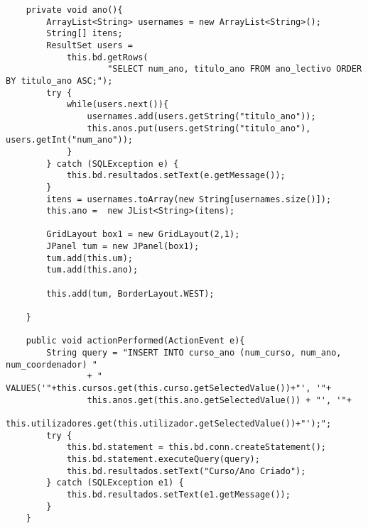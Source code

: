 \begin{lstlisting}
	private void ano(){
		ArrayList<String> usernames = new ArrayList<String>();
		String[] itens;
		ResultSet users = 
			this.bd.getRows(
					"SELECT num_ano, titulo_ano FROM ano_lectivo ORDER BY titulo_ano ASC;");
		try {
			while(users.next()){
				usernames.add(users.getString("titulo_ano"));
				this.anos.put(users.getString("titulo_ano"), users.getInt("num_ano"));
			}
		} catch (SQLException e) {
			this.bd.resultados.setText(e.getMessage());
		}
		itens = usernames.toArray(new String[usernames.size()]);
		this.ano =  new JList<String>(itens);
		
		GridLayout box1 = new GridLayout(2,1);
		JPanel tum = new JPanel(box1);
		tum.add(this.um);
		tum.add(this.ano);
		
		this.add(tum, BorderLayout.WEST);
		
	}
	
	public void actionPerformed(ActionEvent e){
		String query = "INSERT INTO curso_ano (num_curso, num_ano, num_coordenador) " 
				+ " VALUES('"+this.cursos.get(this.curso.getSelectedValue())+"', '"+ 
				this.anos.get(this.ano.getSelectedValue()) + "', '"+
				this.utilizadores.get(this.utilizador.getSelectedValue())+"');";
		try {
			this.bd.statement = this.bd.conn.createStatement();
			this.bd.statement.executeQuery(query);
			this.bd.resultados.setText("Curso/Ano Criado");
		} catch (SQLException e1) {
			this.bd.resultados.setText(e1.getMessage());
		}
    }
\end{lstlisting}